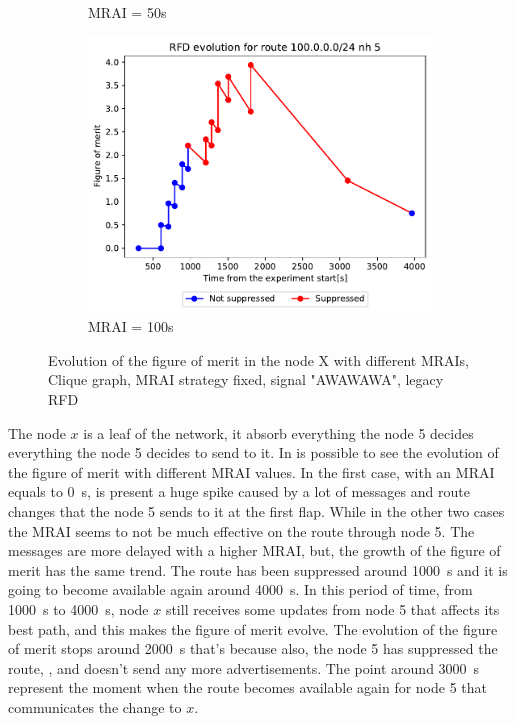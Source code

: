 \begin{figure}[h]
\begin{subfigure}[b]{0.49\textwidth}
         \caption{MRAI = 50s}
         \label{fig:clique_x_mrai50}
     \end{subfigure}
     \begin{subfigure}[b]{0.49\textwidth}
         \centering
         \includegraphics[width=\textwidth]{images/RFD/clique/FigureOfMerit/mrai21_RFD_x_rfd_R1.pdf}
         \caption{MRAI = 100s}
         \label{fig:clique_x_mrai100}
     \end{subfigure}
        \caption{Evolution of the figure of merit in the node X with different MRAIs,
		Clique graph, MRAI strategy fixed, signal "AWAWAWA", legacy RFD}
        \label{fig:clique_nodex}
\end{figure}

The node $x$ is a leaf of the network, it absorb everything the node \num{5} decides
everything the node \num{5} decides
to send to it.
In  is possible to see the evolution of the figure of merit
with different \ac{MRAI} values.
In the first case, with an \ac{MRAI} equals to \SI{0}{\second}, is present a huge
spike caused by a lot of messages and route changes that the node \num{5} sends
to it at the first flap.
While in the other two cases 
the \ac{MRAI} seems to not be much effective on the route through node \num{5}.
The messages are more delayed with a higher \ac{MRAI}, but, the growth of the figure
of merit has the same trend.
The route has been suppressed around \SI{1000}{\second}
and it is going to become available again around \SI{4000}{\second}.
In this period of time, from \SI{1000}{\second} to \SI{4000}{\second}, node $x$ still
receives some updates from node \num{5} that affects its best path, and this
makes the figure of merit evolve.
The evolution of the figure of merit stops around \SI{2000}{\second} that's because
also, the node \num{5} has suppressed the route, , and
doesn't send any more advertisements.
The point around \SI{3000}{\second} represent the moment when the route becomes
available again for node \num{5} that communicates the change to $x$.

